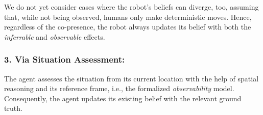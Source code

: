 \documentclass[letterpaper]{article} %
\begin{document}


We do not yet consider cases where the robot's beliefs can diverge, too, assuming that, while not being observed, humans only make deterministic moves. Hence, regardless of the co-presence, the robot always updates its belief with both the \textit{inferrable} and \textit{observable} effects.


\subsubsection{3. Via Situation Assessment:}
The agent assesses the situation from its current location 
with the help of spatial reasoning and its reference frame, i.e., the formalized \textit{observability} model. Consequently, the agent updates its existing belief with the relevant ground truth. 
\end{document}
